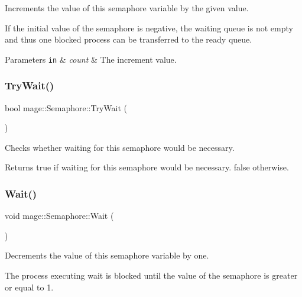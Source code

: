 Increments the value of this semaphore variable by the given value.

If the initial value of the semaphore is negative, the waiting queue is not empty and thus one blocked process can be transferred to the ready queue.


\begin{DoxyParams}[1]{Parameters}
\mbox{\tt in}  & {\em count} & The increment value. \\
\hline
\end{DoxyParams}
\hypertarget{structmage_1_1_semaphore_a46d08edac69437678d05f354f10619de}{}\label{structmage_1_1_semaphore_a46d08edac69437678d05f354f10619de} 
\subsubsection{\texorpdfstring{Try\+Wait()}{TryWait()}}
{\footnotesize\ttfamily bool mage\+::\+Semaphore\+::\+Try\+Wait (\begin{DoxyParamCaption}{ }\end{DoxyParamCaption})\hspace{0.3cm}{\ttfamily [noexcept]}}

Checks whether waiting for this semaphore would be necessary.

\begin{DoxyReturn}{Returns}
{\ttfamily true} if waiting for this semaphore would be necessary. {\ttfamily false} otherwise. 
\end{DoxyReturn}
\hypertarget{structmage_1_1_semaphore_ab0be313e63792315ee9b227dea1184be}{}\label{structmage_1_1_semaphore_ab0be313e63792315ee9b227dea1184be} 
\subsubsection{\texorpdfstring{Wait()}{Wait()}}
{\footnotesize\ttfamily void mage\+::\+Semaphore\+::\+Wait (\begin{DoxyParamCaption}{ }\end{DoxyParamCaption})\hspace{0.3cm}{\ttfamily [noexcept]}}

Decrements the value of this semaphore variable by one.

The process executing wait is blocked until the value of the semaphore is greater or equal to 1. 

